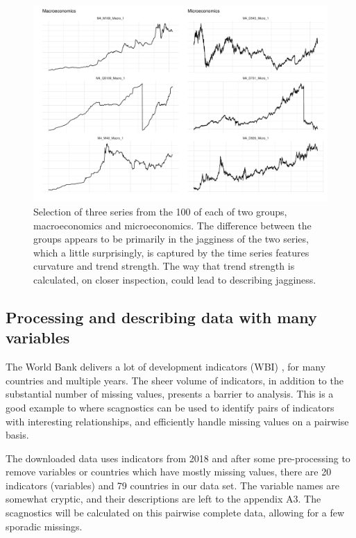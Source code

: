 \begin{Schunk}
\begin{figure}
\includegraphics[width=1\linewidth]{mason-lee-laa-cook_files/figure-latex/tsplots-1} \caption[Selection of three series from the 100 of each of two groups, macroeconomics and microeconomics]{Selection of three series from the 100 of each of two groups, macroeconomics and microeconomics. The difference between the groups appears to be primarily in the jagginess of the two series, which a little surprisingly, is captured by the time series features curvature and trend strength. The way that trend strength is calculated, on closer inspection, could lead to describing jagginess.}\label{fig:tsplots}
\end{figure}
\end{Schunk}

\hypertarget{processing-and-describing-data-with-many-variables}{%
\subsection{Processing and describing data with many
variables}\label{processing-and-describing-data-with-many-variables}}

The World Bank delivers a lot of development indicators (WBI)
\citep{WBI}, for many countries and multiple years. The sheer volume of
indicators, in addition to the substantial number of missing values,
presents a barrier to analysis. This is a good example to where
scagnostics can be used to identify pairs of indicators with interesting
relationships, and efficiently handle missing values on a pairwise
basis.

The downloaded data uses indicators from 2018 and after some
pre-processing to remove variables or countries which have mostly
missing values, there are 20 indicators (variables) and 79 countries in
our data set. The variable names are somewhat cryptic, and their
descriptions are left to the appendix A3. The scagnostics will be
calculated on this pairwise complete data, allowing for a few sporadic
missings.

